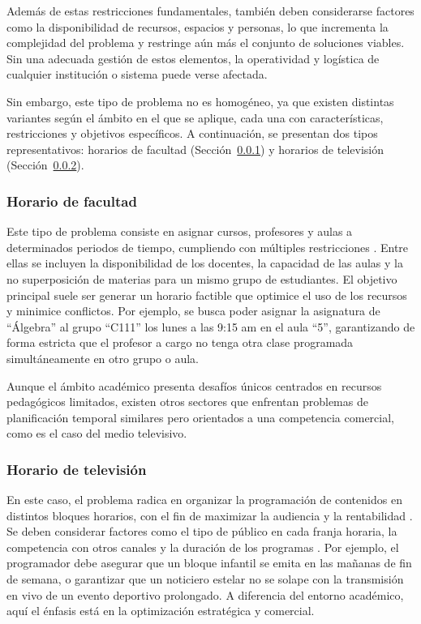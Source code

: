 \documentclass{article}
\begin{document}
Además de estas restricciones fundamentales, también deben considerarse factores como la disponibilidad de recursos, espacios y personas, lo que incrementa la complejidad del problema y restringe aún más el conjunto de soluciones viables. Sin una adecuada gestión de estos elementos, la operatividad y logística de cualquier institución o sistema puede verse afectada.

Sin embargo, este tipo de problema no es homogéneo, ya que existen distintas variantes según el ámbito en el que se aplique, cada una con características, restricciones y objetivos específicos. A continuación, se presentan dos tipos representativos: horarios de facultad (Sección~\ref{sec:facultad}) y horarios de televisión (Sección~\ref{sec:tv}).

\subsubsection{Horario de facultad}
\label{sec:facultad}

Este tipo de problema consiste en asignar cursos, profesores y aulas a determinados periodos de tiempo, cumpliendo con múltiples restricciones \cite{abdennadher2000, muller2005, babaei2015}. Entre ellas se incluyen la disponibilidad de los docentes, la capacidad de las aulas y la no superposición de materias para un mismo grupo de estudiantes. El objetivo principal suele ser generar un horario factible que optimice el uso de los recursos y minimice conflictos. Por ejemplo, se busca poder asignar la asignatura de ``Álgebra'' al grupo ``C111'' los lunes a las 9:15 am en el aula ``5'', garantizando de forma estricta que el profesor a cargo no tenga otra clase programada simultáneamente en otro grupo o aula.

Aunque el ámbito académico presenta desafíos únicos centrados en recursos pedagógicos limitados, existen otros sectores que enfrentan problemas de planificación temporal similares pero orientados a una competencia comercial, como es el caso del medio televisivo.

\subsubsection{Horario de televisión}
\label{sec:tv}

En este caso, el problema radica en organizar la programación de contenidos en distintos bloques horarios, con el fin de maximizar la audiencia y la rentabilidad \cite{bollapragada2002}. Se deben considerar factores como el tipo de público en cada franja horaria, la competencia con otros canales y la duración de los programas \cite{fernandez2008}. Por ejemplo, el programador debe asegurar que un bloque infantil se emita en las mañanas de fin de semana, o garantizar que un noticiero estelar no se solape con la transmisión en vivo de un evento deportivo prolongado. A diferencia del entorno académico, aquí el énfasis está en la optimización estratégica y comercial.
\end{document}
